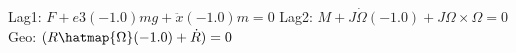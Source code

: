 
Lag1: $F+e3 (-1.0) m g+\ddot{x} (-1.0) m = 0$
Lag2: $M+J \dot{\Omega } (-1.0)+J \Omega \times \Omega  = 0$
Geo: $(R \hatmap{\Omega } (-1.0)+\dot{R}) = 0$